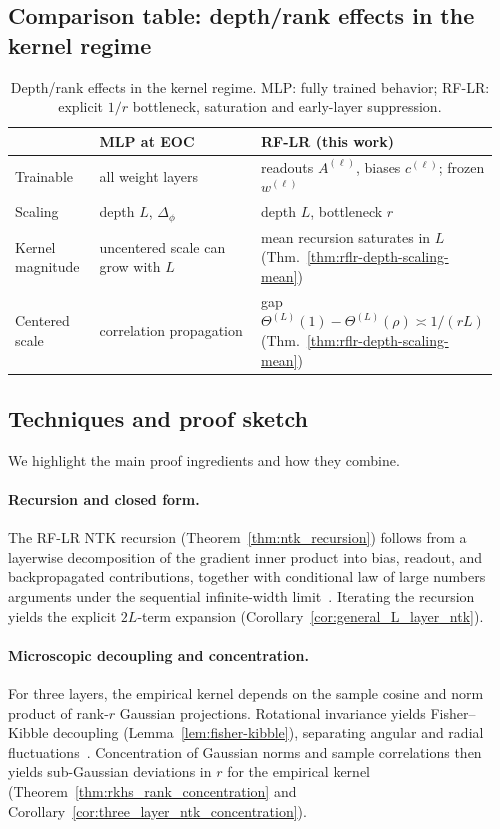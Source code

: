 \subsection{Comparison table: depth/rank effects in the kernel regime}\label{appendix:table-eoc-vs-rflr}
\begin{table}[H]
\centering
\small
\begin{tabular}{@{}p{0.18\linewidth}p{0.40\linewidth}p{0.38\linewidth}@{}}
\hline
 & \textbf{MLP at EOC}~\cite{terjek2025mlpsateoc} & \textbf{RF-LR (this work)} \\
\hline
Trainable & all weight layers & readouts \(A^{(\ell)}\), biases \(c^{(\ell)}\); frozen \(w^{(\ell)}\) \\
\hline
Scaling & depth \(L\), \(\Delta_\phi\) & depth \(L\), bottleneck \(r\) \\
\hline
Kernel magnitude & uncentered scale can grow with \(L\) & mean recursion saturates in \(L\) (Thm.~\ref{thm:rflr-depth-scaling-mean}) \\
\hline
Centered scale & correlation propagation & gap \(\Theta^{(L)}(1)-\Theta^{(L)}(\rho)\asymp 1/(rL)\) (Thm.~\ref{thm:rflr-depth-scaling-mean}) \\
\hline
\end{tabular}
\caption{Depth/rank effects in the kernel regime. MLP: fully trained behavior; RF-LR: explicit \(1/r\) bottleneck, saturation and early-layer suppression.}
\label{tab:eoc-vs-rflr}
\end{table}

\subsection{Techniques and proof sketch}\label{appendix:techniques-proof-sketch}
We highlight the main proof ingredients and how they combine.
\paragraph{Recursion and closed form.}
The RF-LR NTK recursion (Theorem~\ref{thm:ntk_recursion}) follows from a layerwise decomposition of the gradient inner product into bias, readout, and backpropagated contributions, together with conditional law of large numbers arguments under the sequential infinite-width limit~\cite{jacot2018neural}. Iterating the recursion yields the explicit \(2L\)-term expansion (Corollary~\ref{cor:general_L_layer_ntk}).

\paragraph{Microscopic decoupling and concentration.}
For three layers, the empirical kernel depends on the sample cosine and norm product of rank-\(r\) Gaussian projections. Rotational invariance yields Fisher--Kibble decoupling (Lemma~\ref{lem:fisher-kibble}), separating angular and radial fluctuations~\cite{fisher1915probable,hotelling1953new,kibble1941two}. Concentration of Gaussian norms and sample correlations then yields sub-Gaussian deviations in \(r\) for the empirical kernel (Theorem~\ref{thm:rkhs_rank_concentration} and Corollary~\ref{cor:three_layer_ntk_concentration}).


